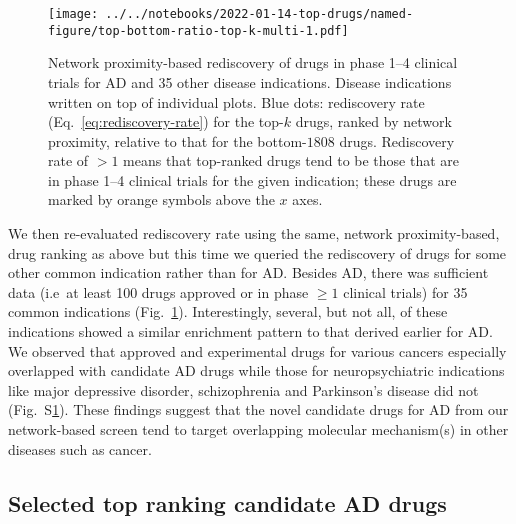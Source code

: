 \documentclass[letterpaper]{article}
\begin{document}
\begin{figure}[p]
\texttt{[image: ../../notebooks/2022-01-14-top-drugs/named-figure/top-bottom-ratio-top-k-multi-1.pdf]}
\caption{
Network proximity-based rediscovery of drugs in phase 1--4 clinical trials for
AD and 35 other disease indications.  Disease indications written on top of
individual plots.  Blue dots: rediscovery rate (Eq.~\ref{eq:rediscovery-rate})
for the top-$k$ drugs, ranked by network proximity, relative to that for the
bottom-$1808$ drugs.  Rediscovery rate of $>1$ means that top-ranked drugs
tend to be those that are in phase 1--4 clinical trials for the given
indication; these drugs are marked by orange symbols above the $x$ axes.
}
\label{fig:ad-drug-rediscovery-multi}
\end{figure}

We then re-evaluated rediscovery rate using the same, network proximity-based,
drug ranking as above but this time we queried the rediscovery of drugs for
some other common indication rather than for AD.  Besides AD, there was
sufficient data (i.e~at least 100 drugs approved or in phase $\ge 1$ clinical
trials) for 35 common indications (Fig.~\ref{fig:ad-drug-rediscovery-multi}).
Interestingly, several, but not all, of these indications showed a similar
enrichment pattern to that derived earlier for AD.  We observed that approved
and experimental drugs for various cancers especially overlapped with
candidate AD drugs while those for neuropsychiatric indications like major
depressive disorder, schizophrenia and Parkinson's disease did not
(Fig.~S\ref{fig:ad-drug-rediscovery-multi}).  These findings suggest that the
novel candidate drugs for AD from our network-based screen tend to target
overlapping molecular mechanism(s) in other diseases such as cancer. 


\subsection{Selected top ranking candidate AD drugs}
\end{document}
